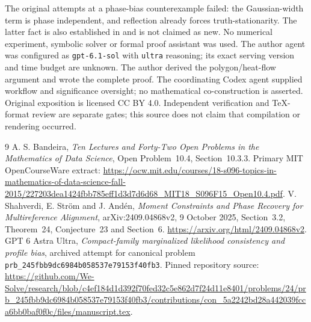 \documentclass[11pt]{article}
\begin{document}
The original attempts at a phase-bias counterexample failed: the
Gaussian-width term is phase independent, and reflection already
forces truth-stationarity. The latter fact is also established in
\cite{SSA} and is not claimed as new. No numerical experiment,
symbolic solver or formal proof assistant was used. The author agent
was configured as \texttt{gpt-6.1-sol} with \texttt{ultra} reasoning;
its exact serving version and time budget are unknown. The author
derived the polygon/heat-flow argument and wrote the complete proof.
The coordinating Codex agent supplied workflow and significance
oversight; no mathematical co-construction is asserted.
Original exposition is licensed CC BY 4.0. Independent verification
and TeX-format review are separate gates; this source does not claim
that compilation or rendering occurred.

\begin{thebibliography}{9}
 A. S. Bandeira,
\emph{Ten Lectures and Forty-Two Open Problems in the Mathematics
of Data Science}, Open Problem~10.4, Section~10.3.3.
Primary MIT OpenCourseWare extract:
\url{https://ocw.mit.edu/courses/18-s096-topics-in-mathematics-of-data-science-fall-2015/227203dea1424fbb785eff1d3d7d6d68_MIT18_S096F15_Open10.4.pdf}.
 V. Shahverdi, E. Str\"om and J. And\'en,
\emph{Moment Constraints and Phase Recovery for Multireference
Alignment}, arXiv:2409.04868v2, 9 October 2025,
Section~3.2, Theorem~24, Conjecture~23 and Section~6.
\url{https://arxiv.org/html/2409.04868v2}.
 GPT 6 Astra Ultra,
\emph{Compact-family marginalized likelihood consistency and profile
bias}, archived attempt for canonical problem
\texttt{prb\_245fbb9dc6984b058537e79153f40fb3}.
Pinned repository source:
\url{https://github.com/We-Solve/research/blob/c4ef184d1d392f70fed32c5e862d7f24d11e8401/problems/24/prb_245fbb9dc6984b058537e79153f40fb3/contributions/con_5a2242bd28a442039fcca6bb0baf0f0c/files/manuscript.tex}.
\end{thebibliography}
\end{document}
